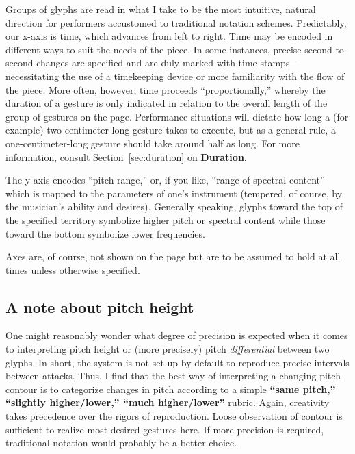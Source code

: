 \documentclass[twoside, 11pt]{book}
\begin{document}
        Groups of \gls{glyphs} are read in what I take to be the most intuitive, natural direction for performers accustomed to traditional notation schemes. Predictably, our x-\gls{axis} is time, which advances from left to right. Time may be encoded in different ways to suit the needs of the piece. In some instances, precise second-to-second changes are specified and are duly marked with time-stamps---necessitating the use of a timekeeping device or more familiarity with the flow of the piece. More often, however, time proceeds ``proportionally,'' whereby the duration of a gesture is only indicated in relation to the overall length of the group of gestures on the page. Performance situations will dictate how long a (for example) two-centimeter-long gesture takes to execute, but as a general rule, a one-centimeter-long gesture should take around half as long. For more information, consult Section~\ref{sec:duration} on \textbf{Duration}.

        The y-axis encodes ``pitch range,'' or, if you like, ``range of spectral content'' which is mapped to the parameters of one's instrument (tempered, of course, by the musician's ability and desires). Generally speaking, glyphs toward the top of the specified territory symbolize higher pitch or spectral content while those toward the bottom symbolize lower frequencies.

        Axes are, of course, not shown on the page but are to be assumed to hold at all times unless otherwise specified.

        \subsection*{A note about pitch height}

        One might reasonably wonder what degree of precision is expected when it comes to interpreting pitch height or (more precisely) pitch \textit{differential} between two glyphs. In short, the system is not set up by default to reproduce precise intervals between attacks. Thus, I find that the best way of interpreting a changing pitch contour is to categorize changes in pitch according to a simple \textbf{``same pitch,'' ``slightly higher/lower,'' ``much higher/lower''} rubric. Again, creativity takes precedence over the rigors of reproduction. Loose observation of contour is sufficient to realize most desired gestures here. If more precision is required,  traditional notation would probably be a better choice.
        
    \newpage
    
\end{document}
